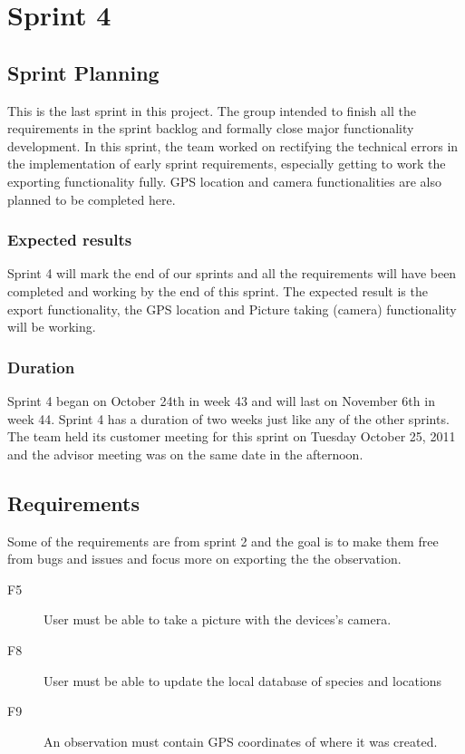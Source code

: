 \section{Sprint 4}

\subsection{Sprint Planning}

This is the last sprint in this project. The group intended to finish all the
requirements in the sprint backlog and formally close major functionality
development. In this sprint, the team worked on rectifying the technical errors
in the implementation of early sprint requirements, especially getting to work
the exporting functionality fully. GPS location and camera functionalities are
also planned to be completed here.

\subsubsection{Expected results}

Sprint 4 will mark the end of our sprints and all the requirements will have
been completed and working by the end of this sprint. The expected result is
the export functionality, the GPS location and Picture taking (camera)
functionality will be working.	

\subsubsection{Duration}

Sprint 4 began on October 24th in week 43 and will last on November 6th in week
44. Sprint 4 has a duration of two weeks just like any of the other sprints.
The team held its customer meeting for this sprint on Tuesday October 25, 2011
and the advisor meeting was on the same date in the afternoon.

\subsection{Requirements}

Some of the requirements are from sprint 2 and the goal is to make them free
from bugs and issues and focus more on exporting the the observation.

\begin{description}
	\item[F5] User must be able to take a picture with the devices's camera.
	\item[F8] User must be able to update the local database of species and locations
	\item[F9] An observation must contain GPS coordinates of where it was created.
\end{description}

